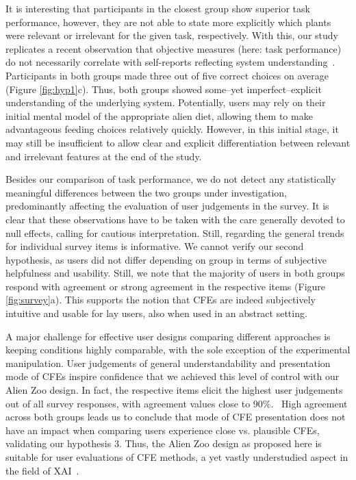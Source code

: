 {%
It is interesting that participants in the closest group show superior task performance, however, they are not able to state more explicitly which plants were relevant or irrelevant for the given task, respectively. 
With this, our study replicates a recent observation that objective measures (here: task performance) do not necessarily correlate with self-reports reflecting system understanding~\citep{van_der_waa_evaluating_2021}.
Participants in both groups made three out of five correct choices on average (Figure \ref{fig:hyp1}c).
Thus, both groups showed some--yet imperfect--explicit understanding of the underlying system.
Potentially, users may rely on their initial mental model of the appropriate alien diet, allowing them to make advantageous feeding choices relatively quickly. However, in this initial stage, it may still be insufficient to allow clear and explicit differentiation between relevant and irrelevant features at the end of the study.

Besides our comparison of task performance, we do not detect any statistically meaningful differences between the two groups under investigation, predominantly affecting the evaluation of user judgements in the survey. 
It is clear that these observations have to be taken with the care generally devoted to null effects, calling for cautious interpretation. 
Still, regarding the general trends for individual survey items is informative.
We cannot verify our second hypothesis, as users did not differ depending on group in terms of subjective helpfulness and usability. 
Still, we note that the majority of users in both groups respond with agreement or strong agreement in the respective items (Figure \ref{fig:survey}a).
This supports the notion that \glspl{CFE} are indeed subjectively intuitive and usable for lay users, also when used in an abstract setting.

A major challenge for effective user designs comparing different approaches is keeping conditions highly comparable, with the sole exception of the experimental manipulation.
User judgements of general understandability and presentation mode of \glspl{CFE} inspire confidence that we achieved this level of control with our Alien Zoo design. 
In fact, the respective items elicit the highest user judgements out of all survey responses, with agreement values close to 90\%.%
~High agreement across both groups leads us to conclude that mode of \gls{CFE} presentation does not have an impact when comparing users experience close vs. plausible \glspl{CFE}, validating our hypothesis 3.
Thus, the Alien Zoo design as proposed here is suitable for user evaluations of \gls{CFE} methods, a yet vastly understudied aspect in the field of \gls{XAI}~\citep{keane_if_2021}.

}

